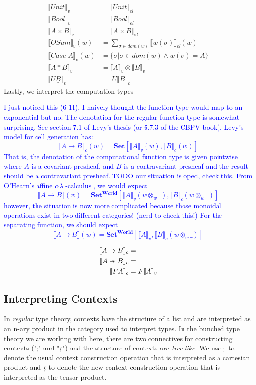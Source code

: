 \documentclass{article}
\newcommand{\den}[1]{\llbracket #1 \rrbracket}
\newcommand{\blue}[1]{\textcolor{blue}{#1}}
\newcommand{\sep}{\mathrel{-\mkern-6mu*}}
\newcommand{\world}{{\mathbf{World}}}
\newcommand{\calculus}{\operatorname{-calculus}}
\begin{document}
\begin{align*}
    \llbracket Unit \rrbracket_v &= \llbracket Unit \rrbracket_{el}\\
    \llbracket Bool \rrbracket_v &= \llbracket Bool \rrbracket_{el}\\
    \llbracket A \times B \rrbracket_v &= \llbracket A \times B \rrbracket_{el}\\
    \llbracket OSum \rrbracket_v (w)&= \sum_{\sigma \in dom(w)} \llbracket w(\sigma) \rrbracket_{el}(w)\\
    \llbracket Case \; A \rrbracket_v(w) &= \{ \sigma | \sigma \in dom(w) \land w(\sigma)= A \} \\
    \llbracket A * B \rrbracket_v &= \llbracket A \rrbracket_v \otimes \llbracket B \rrbracket_v \\
    \llbracket U  \underline{B} \rrbracket_v &= \; U \llbracket B \rrbracket_c 
\end{align*}
Lastly, we interpret the computation types


\blue{
I just noticed this (6-11), I naively thought the function type would map to an exponential but no.
The denotation for the regular function type is somewhat surprising. 
See section 7.1 of Levy's thesis (or 6.7.3 of the CBPV book). Levy's model for cell generation has:
\[
    \den{A \rightarrow B}_c(w)= \mathbf{Set} [ \den{A}_v(w) , \den{B}_c(w) ]
\]
That is, the denotation of the computational function type is given pointwise where $A$ is a covariant presheaf, and $B$ is a
contravariant presheaf and the result should be a contravariant presheaf. TODO our situation is oped, check this. From O'Hearn's affine 
$\alpha\lambda\calculus$, we would expect
\[
    \den{A \rightarrow B}(w)= \mathbf{Set^{\world}}[ \den{A}_v(w \otimes_w \_) , \den{B}_c(w \otimes_w \_)]
\]
however, the situation is now more complicated because those monoidal operations exist in two different categories!
(need to check this!)
For the separating function, we should expect
\[
    \den{A \rightarrow B}(w)= \mathbf{Set^{\world}}[ \den{A}_v , \den{B}_c(w \otimes_w \_)]
\]
}

\begin{align*}
    \llbracket A \rightarrow B \rrbracket_c &= \\
    \llbracket A \sep B \rrbracket_c &= \\
    \llbracket F A \rrbracket_c &= F\llbracket A \rrbracket_v\\
\end{align*}
\subsection{Interpreting Contexts}
In \textit{regular} type theory, contexts have the structure of a list and are interpreted as an n-ary product in the category used 
to interpret types. In the bunched type theory we are working with here, there are two connectives for constructing contexts 
(";" and "$\fatsemi$") and the structure of contexts are \textit{tree-like}. We use $;$ to denote the usual context construction operation 
that is interpreted as a cartesian product and $\fatsemi$ to denote the new context construction operation that is interpreted as the 
tensor product.
\end{document}
